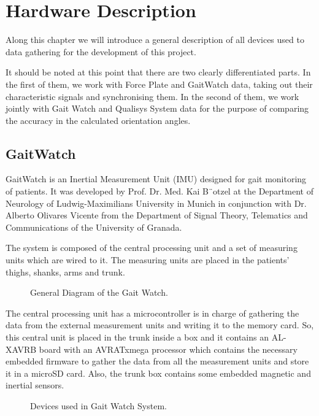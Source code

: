 \chapter{Hardware Description}
\label{ch:Hardware}
Along this chapter we will introduce a general description of all devices used to data gathering for the development of this project.


It should be noted at this point that there are two clearly differentiated parts. In the first of them, we work with Force Plate and GaitWatch data, taking out their characteristic signals and synchronising them. In the second of them, we work jointly with Gait Watch and Qualisys System data for the purpose of comparing the accuracy in the calculated orientation angles.


\section{GaitWatch}

GaitWatch is an Inertial Measurement Unit (IMU) designed for gait monitoring of patients. It was developed by Prof. Dr. Med. Kai B¨otzel at the Department of Neurology of Ludwig-Maximilians University in Munich in conjunction with Dr. Alberto Olivares Vicente from the Department of Signal Theory, Telematics and Communications of the University of Granada. \cite{OlivaresBotzel2013}

The system is composed of the central processing unit and
a set of measuring units which are wired to it. The measuring units are 
placed in the patients’ thighs, shanks, arms and trunk.

\begin{figure}[H]
	\centering
	\caption{General Diagram of the Gait Watch.}
	\label{fig:diagram}
\end{figure}

The central processing unit has a microcontroller is in charge of gathering the data from the external measurement units and writing it to the memory card. So, this central unit is placed in the trunk inside a box and it contains an AL-XAVRB board with an AVRATxmega processor which contains the necessary embedded firmware to gather the data from all the measurement units and store it in a microSD card. Also, the trunk box contains some embedded magnetic and inertial sensors.

\begin{figure}[H]
	\centering
	\caption{Devices used in Gait Watch System.}
	\label{fig:devicesGW}
\end{figure}

